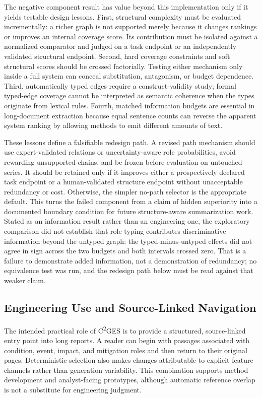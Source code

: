 \documentclass[information,article,submit,moreauthors]{Definitions/mdpi}
\newcommand{\cges}{C\textsuperscript{2}GES}
\begin{document}
The negative component result has value beyond this implementation only if it yields testable design lessons. First, structural complexity must be evaluated incrementally: a richer graph is not supported merely because it changes rankings or improves an internal coverage score. Its contribution must be isolated against a normalized comparator and judged on a task endpoint or an independently validated structural endpoint. Second, hard coverage constraints and soft structural scores should be crossed factorially. Testing either mechanism only inside a full system can conceal substitution, antagonism, or budget dependence. Third, automatically typed edges require a construct-validity study; formal typed-edge coverage cannot be interpreted as semantic coherence when the types originate from lexical rules. Fourth, matched information budgets are essential in long-document extraction because equal sentence counts can reverse the apparent system ranking by allowing methods to emit different amounts of text.

These lessons define a falsifiable redesign path. A revised path mechanism should use expert-validated relations or uncertainty-aware role probabilities, avoid rewarding unsupported chains, and be frozen before evaluation on untouched series. It should be retained only if it improves either a prospectively declared task endpoint or a human-validated structure endpoint without unacceptable redundancy or cost. Otherwise, the simpler no-path selector is the appropriate default. This turns the failed component from a claim of hidden superiority into a documented boundary condition for future structure-aware summarization work. Stated as an information result rather than an engineering one, the exploratory comparison did not establish that role typing contributes discriminative information beyond the untyped graph: the typed-minus-untyped effects did not agree in sign across the two budgets and both intervals crossed zero. That is a failure to demonstrate added information, not a demonstration of redundancy; no equivalence test was run, and the redesign path below must be read against that weaker claim.

\subsection{Engineering Use and Source-Linked Navigation}

The intended practical role of \cges{} is to provide a structured, source-linked entry point into long reports. A reader can begin with passages associated with condition, event, impact, and mitigation roles and then return to their original pages. Deterministic selection also makes changes attributable to explicit feature channels rather than generation variability. This combination supports method development and analyst-facing prototypes, although automatic reference overlap is not a substitute for engineering judgment.
\end{document}
